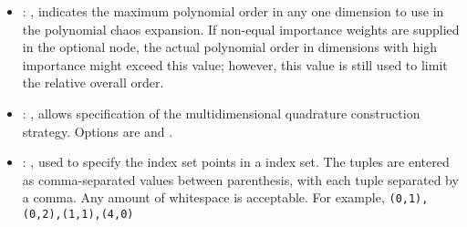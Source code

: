 \begin{itemize}
    \item {}: , 
      indicates the maximum polynomial order in any one dimension to use in the
      polynomial chaos expansion. \nb If non-equal importance weights are supplied in the optional
       node, the actual polynomial order in dimensions with high
      importance might exceed this value; however, this value is still used to limit the
      relative overall order.

    \item {}: , 
      allows specification of the multidimensional
      quadrature construction strategy.  Options are  and .

    \item {}: , 
      used to specify the index set points in a  index set.  The tuples are
      entered as comma-separated values between parenthesis, with each tuple separated by a comma.
      Any amount of whitespace is acceptable.  For example,
      \verb'(0,1),(0,2),(1,1),(4,0)'


\end{itemize}
